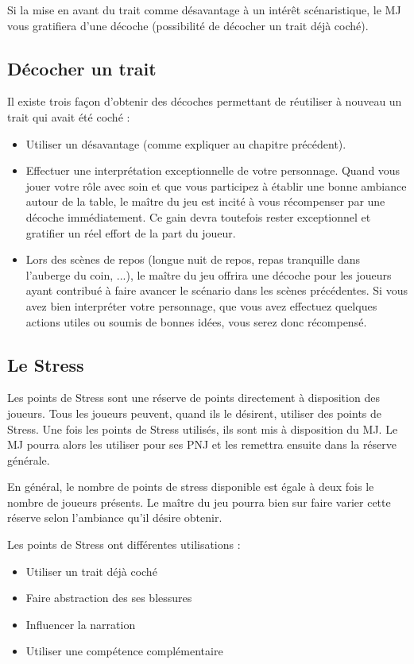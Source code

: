 Si la mise en avant du trait comme désavantage à un intérêt scénaristique, le MJ vous gratifiera d'une décoche (possibilité de décocher un trait déjà coché). 

\subsection{Décocher un trait}

Il existe trois façon d'obtenir des décoches permettant de réutiliser à nouveau un trait qui avait été coché :

\begin{itemize}
\item Utiliser un désavantage (comme expliquer au chapitre précédent).
\item Effectuer une interprétation exceptionnelle de votre personnage. Quand vous jouer votre rôle avec soin et que vous participez à établir une bonne ambiance autour de la table, le maître du jeu est incité à vous récompenser par une décoche immédiatement. Ce gain devra toutefois rester exceptionnel et gratifier un réel effort de la part du joueur.
\item Lors des scènes de repos (longue nuit de repos, repas tranquille dans l'auberge du coin, ...), le maître du jeu offrira une décoche pour les joueurs ayant contribué à faire avancer le scénario dans les scènes précédentes. Si vous avez bien interpréter votre personnage, que vous avez effectuez quelques actions utiles ou soumis de bonnes idées, vous serez donc récompensé.
\end{itemize}

\subsection{Le Stress}

Les points de Stress sont une réserve de points directement à disposition des joueurs. Tous les joueurs peuvent, quand ils le désirent, utiliser des points de Stress. Une fois les points de Stress utilisés, ils sont mis à disposition du MJ. Le MJ pourra alors les utiliser pour ses PNJ et les remettra ensuite dans la réserve générale.

En général, le nombre de points de stress disponible est égale à deux fois le nombre de joueurs présents. Le maître du jeu pourra bien sur faire varier cette réserve selon l'ambiance qu'il désire obtenir.

Les points de Stress ont différentes utilisations :

\begin{itemize}
\item Utiliser un trait déjà coché
\item Faire abstraction des ses blessures
\item Influencer la narration
\item Utiliser une compétence complémentaire
\end{itemize}

